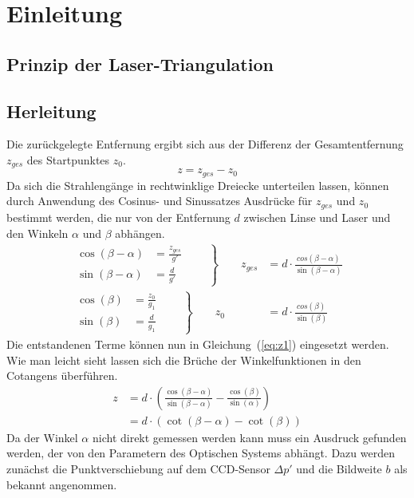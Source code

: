 \section{Einleitung}

\subsection{Prinzip der Laser-Triangulation}

\subsection{Herleitung}
Die zurückgelegte Entfernung ergibt sich aus der Differenz der Gesamtentfernung $z_{ges}$ des Startpunktes $z_0$.
\begin{equation}
	z = z_{ges} - z_0
	\label{eq:z1}
\end{equation}
Da sich die Strahlengänge in rechtwinklige Dreiecke unterteilen lassen, können durch Anwendung des Cosinus- und Sinussatzes Ausdrücke für $z_{ges}$ und $z_0$ bestimmt werden, die nur von der Entfernung $d$ zwischen Linse und Laser und den Winkeln $\alpha$ und $\beta$ abhängen.
\begin{align}
	\left.\begin{aligned}
		\cos(\beta-\alpha) &= \frac{z_{ges}}{g'}\\
		\sin(\beta-\alpha) &= \frac{d}{g'}
	\end{aligned}\qquad\right\}\qquad z_{ges} &= d\cdot\frac{cos(\beta-\alpha)}{\sin(\beta-\alpha)}\\[1em]
	\left.\begin{aligned}
		\cos(\beta) &= \frac{z_0}{g_1}\\ 
		\sin(\beta) &= \frac{d}{g_1}
	\end{aligned}\qquad\right\}\qquad z_0 &= d\cdot\frac{cos(\beta)}{\sin(\beta)}
\end{align}
Die entstandenen Terme können nun in Gleichung~(\ref{eq:z1}) eingesetzt werden. Wie man leicht sieht lassen sich die Brüche der Winkelfunktionen in den Cotangens überführen. 
\begin{align}
	z &= d\cdot\left(\frac{\cos(\beta-\alpha)}{\sin(\beta-\alpha)}-\frac{\cos(\beta)}{\sin(\alpha)}\right)\\
	  &= d\cdot\left(\cot(\beta-\alpha)-\cot(\beta)\right)
	  \label{eq:z2}
\end{align}
Da der Winkel $\alpha$ nicht direkt gemessen werden kann muss ein Ausdruck gefunden werden, der von den Parametern des Optischen Systems abhängt. Dazu werden zunächst die Punktverschiebung auf dem CCD-Sensor $\Delta p'$ und die Bildweite $b$ als bekannt angenommen.
